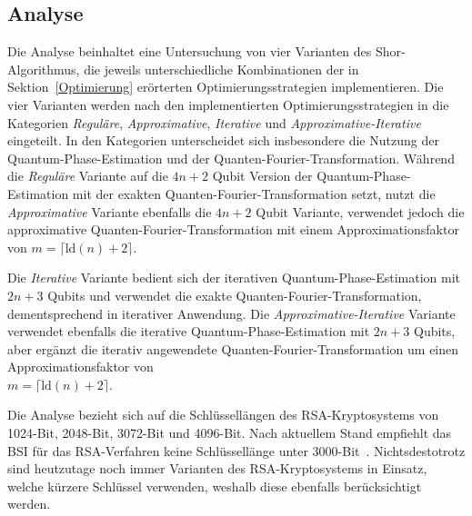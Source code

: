 \subsection*{Analyse}
Die Analyse beinhaltet eine Untersuchung von vier Varianten des Shor-Algorithmus, 
die jeweils unterschiedliche Kombinationen der in Sektion~\ref{Optimierung} erörterten Optimierungsstrategien implementieren.
Die vier Varianten werden nach den implementierten Optimierungsstrategien in die Kategorien \textit{Reguläre}, 
\textit{Approximative}, \textit{Iterative} und \textit{Approximative-Iterative} eingeteilt.
In den Kategorien unterscheidet sich insbesondere die Nutzung der Quantum-Phase-Estimation und der Quanten-Fourier-Transformation. 
Während die \textit{Reguläre} Variante auf die \(4n+2\) Qubit Version der Quantum-Phase-Estimation mit der exakten Quanten-Fourier-Transformation setzt, 
nutzt die \textit{Approximative} Variante ebenfalls die \(4n+2\) Qubit Variante, 
verwendet jedoch die approximative Quanten-Fourier-Transformation mit einem Approximationsfaktor von \(m = \lceil\text{ld}(n)+2\rceil\).

Die \textit{Iterative} Variante bedient sich der iterativen Quantum-Phase-Estimation mit \(2n+3\) Qubits und 
verwendet die exakte Quanten-Fourier-Transformation, dementsprechend in iterativer Anwendung.
Die \textit{Approximative-Iterative} Variante verwendet ebenfalls die iterative Quantum-Phase-Estimation mit \(2n+3\) Qubits, 
aber ergänzt die iterativ angewendete Quanten-Fourier-Transformation um einen Approximationsfaktor von \\\(m = \lceil\text{ld}(n)+2\rceil\).

Die Analyse bezieht sich auf die Schlüssellängen des RSA-Kryptosystems von 1024-Bit, 2048-Bit, 3072-Bit und 4096-Bit. 
Nach aktuellem Stand empfiehlt das BSI für das RSA-Verfahren keine Schlüssellänge unter 3000-Bit~\cite[41]{BSI2023}. 
Nichtsdestotrotz sind heutzutage noch immer Varianten des RSA-Kryptosystems in Einsatz, welche kürzere Schlüssel verwenden, 
weshalb diese ebenfalls berücksichtigt werden.

\vspace{1em}

